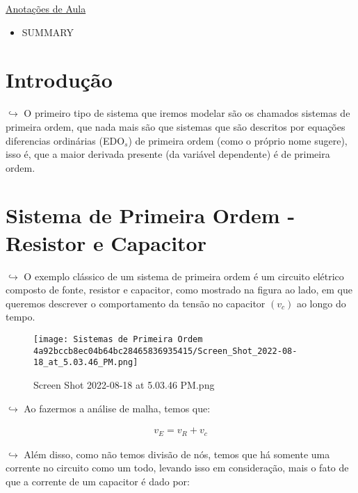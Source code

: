 \documentclass{article}
\begin{document}
\begin{itemize}
\href{Sistemas\%20de\%20Primeira\%20Ordem\%204a92bccb8ec04b64bc28465836935415/Anotac\%CC\%A7o\%CC\%83es\%20de\%20Aula\%20ae75928b9b3641cf8b22e4fdb1b6b467.md}{Anotações
de Aula}

\begin{itemize}
\tightlist
\item
  SUMMARY
\end{itemize}

\hypertarget{introduuxe7uxe3o-1}{%
\section{Introdução}\label{introduuxe7uxe3o-1}}

\(\hookrightarrow\) O primeiro tipo de sistema que iremos modelar são os
chamados sistemas de primeira ordem, que nada mais são que sistemas que
são descritos por equações diferencias ordinárias (EDO\(_s\)) de
primeira ordem (como o próprio nome sugere), isso é, que a maior
derivada presente (da variável dependente) é de primeira ordem.

\hypertarget{sistema-de-primeira-ordem---resistor-e-capacitor}{%
\section{Sistema de Primeira Ordem - Resistor e
Capacitor}\label{sistema-de-primeira-ordem---resistor-e-capacitor}}

\(\hookrightarrow\) O exemplo clássico de um sistema de primeira ordem é
um circuito elétrico composto de fonte, resistor e capacitor, como
mostrado na figura ao lado, em que queremos descrever o comportamento da
tensão no capacitor \((v_c)\) ao longo do tempo.

\begin{figure}
\centering
\texttt{[image: Sistemas de Primeira Ordem 4a92bccb8ec04b64bc28465836935415/Screen\_Shot\_2022-08-18\_at\_5.03.46\_PM.png]}
\caption{Screen Shot 2022-08-18 at 5.03.46 PM.png}
\end{figure}

\(\hookrightarrow\) Ao fazermos a análise de malha, temos que:

\[
\begin{align}v_E = v_R + v_c\end{align}
\]

\(\hookrightarrow\) Além disso, como não temos divisão de nós, temos que
há somente uma corrente no circuito como um todo, levando isso em
consideração, mais o fato de que a corrente de um capacitor é dado por:


\end{itemize}
\end{document}
